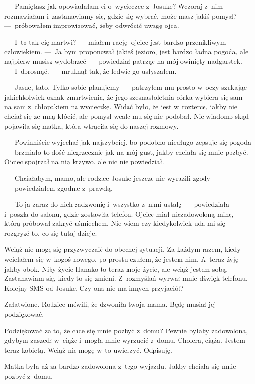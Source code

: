 ---~Pamiętasz jak opowiadałam ci o~wycieczce z~Josuke?  Wczoraj z~nim rozmawiałam i~zastanawiamy się, gdzie się 
wybrać, może masz jakiś pomysł? ---~próbowałem improwizować, żeby odwrócić uwagę ojca.

---~I~to tak cię martwi? ---~miałem rację, ojciec jest bardzo przenikliwym człowiekiem. ---~Ja bym proponował jakieś 
jezioro, jest bardzo ładna pogoda, ale najpierw musisz wydobrzeć ---~powiedział patrząc na mój owinięty nadgarstek. 
---~I~dorosnąć. ---~mruknął tak, że ledwie go usłyszałem. 

---~Jasne, tato. Tylko sobie planujemy ---~patrzyłem mu prosto w~oczy szukając jakichkolwiek oznak zmartwienia, że 
jego szesnastoletnia córka wybiera się sam na sam z~chłopakiem na wycieczkę. Widać było, że jest w~rozterce, jakby 
nie chciał się ze mną kłócić, ale pomysł wcale mu się nie podobał. Nie wiadomo skąd pojawiła się matka, która 
wtrąciła się do naszej rozmowy.

---~Powinniście wyjechać jak najszybciej, bo podobno niedługo zepsuje się pogoda ---~brzmiało to dość niegrzecznie 
jak na mój gust, jakby chciała się mnie pozbyć. Ojciec spojrzał na nią krzywo, ale nic nie powiedział.

---~Chciałabym, mamo, ale rodzice Josuke jeszcze nie wyrazili zgody ---~powiedziałem zgodnie z~prawdą.

---~To ja zaraz do nich zadzwonię i~wszystko z~nimi ustalę ---~powiedziała i~poszła do salonu, gdzie zostawiła telefon.
Ojciec miał niezadowoloną minę, którą próbował zakryć uśmiechem. Nie wiem czy kiedykolwiek uda mi się rozgryźć to, co 
się tutaj dzieje. 

Wciąż nie mogę się przyzwyczaić do obecnej sytuacji. Za każdym razem, kiedy wcielałem się w~kogoś nowego, po prostu 
czułem, że jestem nim. A~teraz żyję jakby obok. Niby życie Hanako to teraz moje życie, ale wciąż jestem sobą. 
Zastanawiam się, kiedy to się zmieni. Z~rozmyślań wyrwał mnie dźwięk telefonu. Kolejny SMS od Josuke. Czy ona nie ma 
innych przyjaciół?

\begin{sms}
Załatwione. Rodzice mówili, że dzwoniła twoja mama. Będę musiał jej podziękować. 
\end{sms}

Podziękować za to, że chce się mnie pozbyć z~domu? Pewnie byłaby zadowolona, gdybym zaszedł w~ciąże i~mogła mnie 
wyrzucić z~domu. Cholera, ciąża. Jestem teraz kobietą. Wciąż nie mogę w~to uwierzyć. Odpisuję.

\begin{sms}
Matka była aż za bardzo zadowolona z~tego wyjazdu. Jakby chciała się mnie pozbyć z~domu.
\end{sms}

